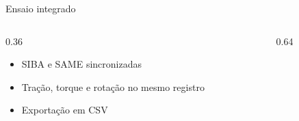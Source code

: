 \begin{frame}{Ensaio integrado}
  \ilustrativo
  \begin{columns}[c]
    \begin{column}{0.36\textwidth}
      \begin{itemize}
        \item SIBA e SAME sincronizadas
        \item Tração, torque e rotação no mesmo registro
        \item Exportação em CSV
      \end{itemize}
    \end{column}
    \begin{column}{0.64\textwidth}
      \centering
      \fonte
    \end{column}
  \end{columns}
\end{frame}
